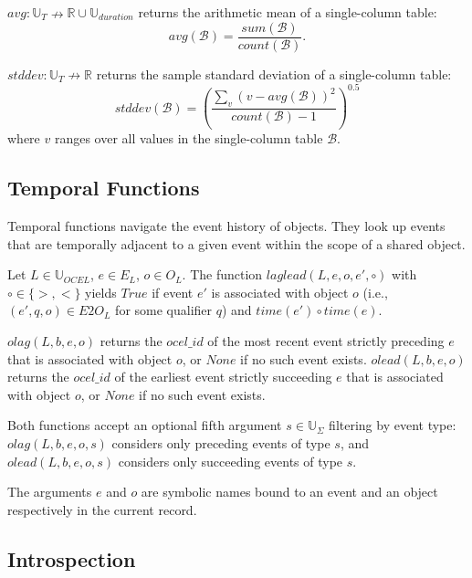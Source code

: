\begin{frameddef}[avg]
$avg : \mathbb{U}_T \nrightarrow \mathbb{R} \cup \mathbb{U}_{duration}$ returns the arithmetic mean of a single-column table:
\[
avg(\mathcal{B}) = \frac{sum(\mathcal{B})}{count(\mathcal{B})}.
\]
\end{frameddef}

\begin{frameddef}[stddev]
$stddev : \mathbb{U}_T \nrightarrow \mathbb{R}$ returns the sample standard deviation of a single-column table:
\[
stddev(\mathcal{B}) = \left( \frac{\sum_{v} (v - avg(\mathcal{B}))^2}{count(\mathcal{B}) - 1} \right)^{0.5}
\]
where $v$ ranges over all values in the single-column table $\mathcal{B}$.
\end{frameddef}

\subsection{Temporal Functions}

Temporal functions navigate the event history of objects. They look up events that are temporally adjacent to a given event within the scope of a shared object.

\begin{frameddef}
Let $L \in \mathbb{U}_{OCEL}$, $e \in E_L$, $o \in O_L$. The function $laglead(L, e, o, e', \circ)$ with $\circ \in \{ >, < \}$ yields $True$ if event $e'$ is associated with object $o$ (i.e., $(e', q, o) \in E2O_L$ for some qualifier $q$) and $time(e') \circ time(e)$.

$olag(L, b, e, o)$ returns the $ocel\_id$ of the most recent event strictly preceding $e$ that is associated with object $o$, or $None$ if no such event exists. $olead(L, b, e, o)$ returns the $ocel\_id$ of the earliest event strictly succeeding $e$ that is associated with object $o$, or $None$ if no such event exists.

Both functions accept an optional fifth argument $s \in \mathbb{U}_\Sigma$ filtering by event type: $olag(L, b, e, o, s)$ considers only preceding events of type $s$, and $olead(L, b, e, o, s)$ considers only succeeding events of type $s$.

The arguments $e$ and $o$ are symbolic names bound to an event and an object respectively in the current record.
\end{frameddef}

\subsection{Introspection}

